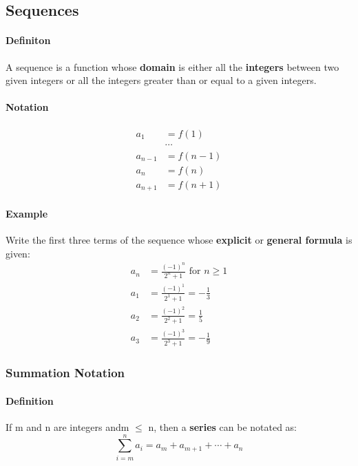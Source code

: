 \subsection{Sequences}
\hrulefill

\paragraph*{Definiton}
A sequence is a function whose \textbf{domain} is either all the \textbf{integers} between two given integers 
or all the integers greater than or equal to a given integers.

\paragraph*{Notation}
\begin{align*}
    a_1 &= f(1)\\
    &\cdots\\
    a_{n-1} &= f(n-1)\\
    a_n &= f(n)\\
    a_{n+1} &= f(n+1)
\end{align*}

\paragraph*{Example}
Write the first three terms of the sequence whose \textbf{explicit} or \textbf{general formula} is given:
\begin{align*}
    a_n &= \frac{(-1)^n}{2^n + 1} \text{ for } n \geq 1\\
    a_1 &= \frac{(-1)^1}{2^1 + 1} = - \frac{1}{3}\\
    a_2 &= \frac{(-1)^2}{2^2 + 1} = \frac{1}{5}\\
    a_3 &= \frac{(-1)^3}{2^3 + 1} = - \frac{1}{9}
\end{align*}

\subsubsection*{Summation Notation}
\paragraph*{Definition}
If m and n are integers andm $\leq$ n, then a \textbf{series} can be notated as:
\begin{equation*}
    \sum_{i=m}^n a_i = a_m + a_{m+1} + \cdots + a_n
\end{equation*} 

